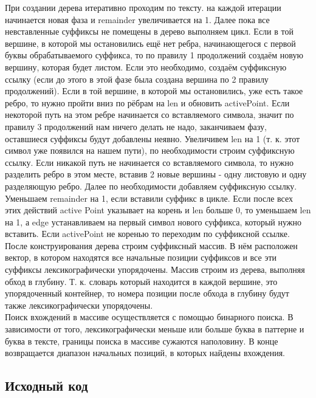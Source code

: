\documentclass[12pt]{article}
\begin{document}
При создании дерева итеративно проходим по тексту. на каждой итерации начинается новая фаза и remainder увеличивается на 1. Далее пока все невставленные суффиксы не помещены в дерево выполняем цикл. Если в той вершине, в которой мы остановились ещё нет ребра, начинающегося с первой буквы обрабатываемого суффикса, то по правилу 1 продолжений создаём новую вершину, которая будет листом. Если это необходимо, создаём суффиксную ссылку (если до этого в этой фазе была создана вершина по 2 правилу продолжений). Если в той вершине, в которой мы остановились, уже есть такое ребро, то нужно пройти вниз по рёбрам на len и обновить activePoint. Если некоторой путь на этом ребре начинается со вставляемого символа, значит по правилу 3 продолжений нам ничего делать не надо, заканчиваем фазу, оставшиеся суффиксы будут добавлены неявно. Увеличивем len на 1 (т. к. этот символ уже появился на нашем пути), по необходимости строим суффиксную ссылку. Если никакой путь не начинается со вставляемого символа, то нужно разделить ребро в этом месте, вставив 2 новые вершины - одну листовую и одну разделяющую ребро. Далее по необходимости добавляем суффиксную ссылку. Уменьшаем remainder на 1, если вставили суффикс в цикле. Если после всех этих действий active Point указывает на корень и len больше 0, то  уменьшаем len на 1, а edge устанавливаем на первый символ нового суффикса, который нужно вставить. Если activePoint не коренью то переходим по суффиксной ссылке.\\

После конструирования дерева строим суффиксный массив. В нём расположен вектор, в котором находятся все начальные позиции суффиксов и все эти суффиксы лексикографически упорядочены. Массив строим из дерева, выполняя обход в глубину. Т. к. словарь который находится в каждой вершине, это упорядоченный контейнер, то номера позиции после обхода в глубину будут также лексикографически упорядочены.\\

Поиск вхождений в массиве осуществляется с помощью бинарного поиска. В зависимости от того, лексикографически меньше или больше буква в паттерне и буква в тексте, границы поиска в массиве сужаются наполовину. В конце возвращается диапазон начальных позиций, в которых найдены вхождения.


\subsection*{Исходный код}
\end{document}
